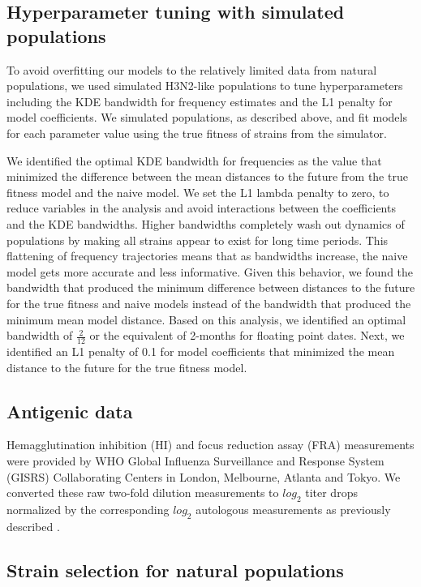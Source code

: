 \documentclass[9pt,lineno]{elife} %
\providecommand{\DIFaddbegin}{} %
\providecommand{\DIFaddend}{} %
\providecommand{\DIFdelbegin}{} %
\providecommand{\DIFdelend}{} %
\providecommand{\DIFaddbegin}{} %
\providecommand{\DIFaddend}{} %
\providecommand{\DIFdelbegin}{} %
\providecommand{\DIFdelend}{} %
\newcommand{\DIFscaledelfig}{0.5}
\newlength{\DIFdelgraphicswidth} %
\newlength{\DIFdelgraphicsheight} %
\newcommand{\DIFaddincludegraphics}[2][]{{\color{blue}\fbox{\DIFOincludegraphics[#1]{#2}}}} %
\newcommand{\DIFdelincludegraphics}[2][]{%
\sbox{\DIFdelgraphicsbox}{\DIFOincludegraphics[#1]{#2}}%
\settoboxwidth{\DIFdelgraphicswidth}{\DIFdelgraphicsbox} %
\settoboxtotalheight{\DIFdelgraphicsheight}{\DIFdelgraphicsbox} %
\scalebox{\DIFscaledelfig}{%
\parbox[b]{\DIFdelgraphicswidth}{\usebox{\DIFdelgraphicsbox}\\[-\baselineskip] \rule{\DIFdelgraphicswidth}{0em}}\llap{\resizebox{\DIFdelgraphicswidth}{\DIFdelgraphicsheight}{%
\setlength{\unitlength}{\DIFdelgraphicswidth}%
\begin{picture}(1,1)%
\thicklines\linethickness{2pt} %
{\color[rgb]{1,0,0}\put(0,0){\framebox(1,1){}}}%
{\color[rgb]{1,0,0}\put(0,0){\line( 1,1){1}}}%
{\color[rgb]{1,0,0}\put(0,1){\line(1,-1){1}}}%
\end{picture}%
}\hspace*{3pt}}} %
} %
\DeclareRobustCommand{\DIFaddbegin}{\DIFOaddbegin \let\includegraphics\DIFaddincludegraphics} %
\DeclareRobustCommand{\DIFaddend}{\DIFOaddend \let\includegraphics\DIFOincludegraphics} %
\DeclareRobustCommand{\DIFdelbegin}{\DIFOdelbegin \let\includegraphics\DIFdelincludegraphics} %
\DeclareRobustCommand{\DIFdelend}{\DIFOaddend \let\includegraphics\DIFOincludegraphics} %
\begin{document}
\DIFaddend \subsection*{Hyperparameter tuning with simulated populations}

To avoid overfitting our models to the relatively limited data from natural populations, we used simulated H3N2-like populations to tune hyperparameters including the KDE bandwidth for frequency estimates and the L1 penalty for model coefficients.
We simulated populations, as described above, and fit models for each parameter value using the true fitness of strains from the simulator.

We identified the optimal KDE bandwidth for frequencies as the value that minimized the difference between the mean distances to the future from the true fitness model and the naive model.
We set the L1 lambda penalty to zero, to reduce variables in the analysis and avoid interactions between the coefficients and the KDE bandwidths.
Higher bandwidths completely wash out dynamics of populations by making all strains appear to exist for long time periods.
This flattening of frequency trajectories means that as bandwidths increase, the naive model gets more accurate and less informative.
Given this behavior, we found the bandwidth that produced the minimum difference between distances to the future for the true fitness and naive models instead of the bandwidth that produced the minimum mean model distance.
Based on this analysis, we identified an optimal bandwidth of $\frac{2}{12}$ or the equivalent of 2-months for floating point dates.
Next, we identified an L1 penalty of 0.1 for model coefficients that minimized the mean distance to the future for the true fitness model.

\subsection*{Antigenic data}

Hemagglutination inhibition (HI) and focus reduction assay (FRA) measurements were provided by WHO Global Influenza Surveillance and Response System (GISRS) Collaborating Centers in London, Melbourne, Atlanta and Tokyo.
We converted these raw two-fold dilution measurements to $log_{2}$ titer drops normalized by the corresponding $log_{2}$ autologous measurements as previously described \DIFdelbegin %
\DIFdelend \DIFaddbegin \citep{Neher:2016hy}\DIFaddend .

\subsection*{Strain selection for natural populations}
\end{document}
